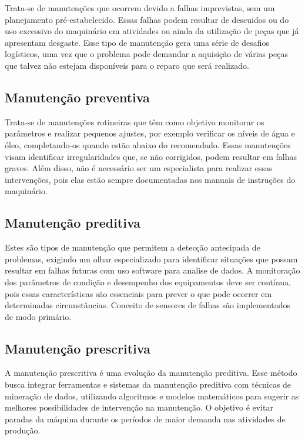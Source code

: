 Trata-se de manutenções que ocorrem devido a falhas imprevistas, sem um planejamento pré-estabelecido. Essas falhas podem resultar de descuidos ou do uso excessivo do maquinário em atividades ou ainda da utilização de peças que já apresentam desgaste. Esse tipo de manutenção gera uma série de desafios logísticos, uma vez que o problema pode demandar a aquisição de várias peças que talvez não estejam disponíveis para o reparo que será realizado.

\subsection{Manutenção preventiva}
\label{sub:manutencao_preventiva}

Trata-se de manutenções rotineiras que têm como objetivo monitorar os parâmetros e realizar pequenos ajustes, por exemplo verificar os níveis de água e óleo, completando-os quando estão abaixo do recomendado. Essas manutenções visam identificar irregularidades que, se não corrigidos, podem resultar em falhas graves. Além disso, não é necessário ser um especialista para realizar essas intervenções, pois elas estão sempre documentadas nos manuais de instruções do maquinário.

\subsection{Manutenção preditiva}
\label{sub:manutencao_preditiva}

Estes são tipos de manutenção que permitem a detecção antecipada de problemas, exigindo um olhar especializado para identificar situações que possam resultar em falhas futuras com uso software para analise de dados. A monitoração dos parâmetros de condição e desempenho dos equipamentos deve ser contínua, pois essas características são essenciais para prever o que pode ocorrer em determinadas circunstâncias. Conceito de sensores de falhas são implementados de modo primário.

\subsection{Manutenção prescritiva}
\label{sec:manutencao_prescritiva}

A manutenção prescritiva é uma evolução da manutenção preditiva. Esse método busca integrar ferramentas e sistemas da manutenção preditiva com técnicas de mineração de dados, utilizando algoritmos e modelos matemáticos para sugerir as melhores possibilidades de intervenção na manutenção. O objetivo é evitar paradas da máquina durante os períodos de maior demanda nas atividades de produção.

